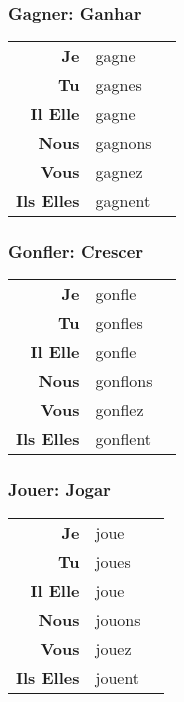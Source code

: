 \documentclass{subfiles}
\begin{document}
\begin{multicols*}{3}
        \subsubsection{Gagner: Ganhar}
            \begin{tabular}{r l r}
                \textbf{Je}        & gagne   &\\
                \textbf{Tu}        & gagnes  &\\
                \textbf{Il Elle}   & gagne   &\\
                \textbf{Nous}      & gagnons &\\
                \textbf{Vous}      & gagnez  &\\
                \textbf{Ils Elles} & gagnent &
            \end{tabular}

        \subsubsection{Gonfler: Crescer}
            \begin{tabular}{r l r}
                \textbf{Je}        & gonfle   &\\
                \textbf{Tu}        & gonfles  &\\
                \textbf{Il Elle}   & gonfle   &\\
                \textbf{Nous}      & gonflons &\\
                \textbf{Vous}      & gonflez  &\\
                \textbf{Ils Elles} & gonflent &
            \end{tabular}

        \subsubsection{Jouer: Jogar}
            \begin{tabular}{r l r}
                \textbf{Je}        & joue   &\\
                \textbf{Tu}        & joues  &\\
                \textbf{Il Elle}   & joue   &\\
                \textbf{Nous}      & jouons &\\
                \textbf{Vous}      & jouez  &\\
                \textbf{Ils Elles} & jouent &
            \end{tabular}


\end{multicols*}
\end{document}
